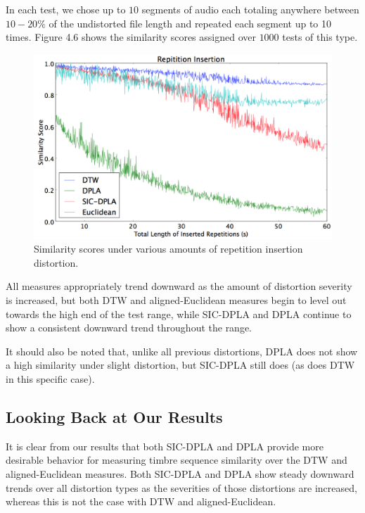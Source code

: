 \documentclass[a4paper,12pt]{report} 	%
\numberwithin{figure}{chapter}
\numberwithin{table}{chapter}
\numberwithin{equation}{chapter}
\begin{document}
\begin{flushleft}
In each test, we chose up to $10$ segments of audio each totaling anywhere between $10-20\%$ of the undistorted file length and repeated each segment up to 10 times. Figure 4.6 shows the similarity scores assigned over $1000$ tests of this type.
\begin{figure}[h!]
\begin{center}
\includegraphics[scale=0.5,width=\linewidth]{RepetitionInsertion}
\caption[Repetition Insertion Results]{Similarity scores under various amounts of repetition insertion distortion.}
\end{center}
\end{figure}

All measures appropriately trend downward as the amount of distortion severity is increased, but both DTW and aligned-Euclidean measures begin to level out towards the high end of the test range, while SIC-DPLA and DPLA continue to show a consistent downward trend throughout the range. 

It should also be noted that, unlike all previous distortions, DPLA does not show a high similarity under slight distortion, but SIC-DPLA still does (as does DTW in this specific case).

\subsection{Looking Back at Our Results}

It is clear from our results that both SIC-DPLA and DPLA provide more desirable behavior for measuring timbre sequence similarity over the DTW and aligned-Euclidean measures. Both SIC-DPLA and DPLA show steady downward trends over all distortion types as the severities of those distortions are increased, whereas this is not the case with DTW and aligned-Euclidean.


\end{flushleft}
\end{document}

